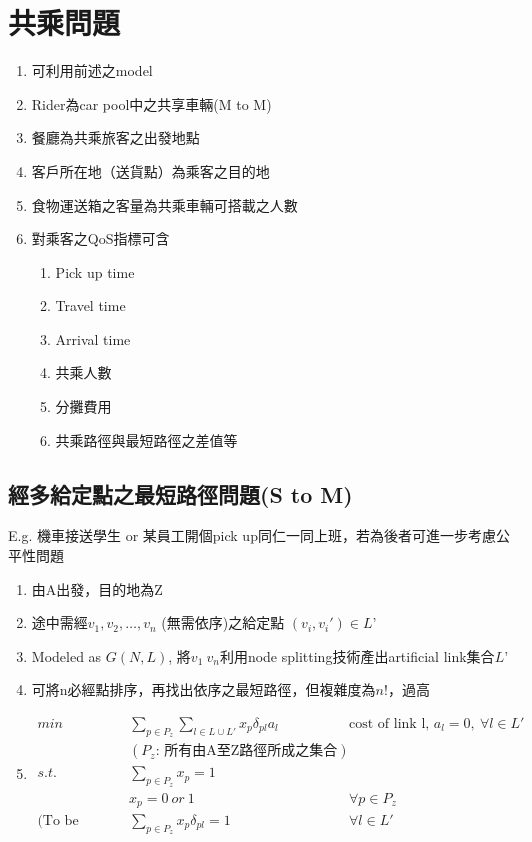 \documentclass{article}
\begin{document}
\section*{共乘問題}

\begin{enumerate}
\def\labelenumi{\arabic{enumi}.}
  \item 可利用前述之model
  \item Rider為car pool中之共享車輛(M to M)
  \item 餐廳為共乘旅客之出發地點
  \item 客戶所在地（送貨點）為乘客之目的地
  \item 食物運送箱之客量為共乘車輛可搭載之人數
  \item 對乘客之QoS指標可含
    \begin{enumerate}
      \def\labelenumii{\arabic{enumii}.}
      \item Pick up time
      \item Travel time
      \item Arrival time
      \item 共乘人數
      \item 分攤費用
      \item 共乘路徑與最短路徑之差值等
    \end{enumerate}
\end{enumerate}

\subsection*{經多給定點之最短路徑問題(S to M)}
E.g. 機車接送學生 or 某員工開個pick up同仁一同上班，若為後者可進一步考慮公平性問題

\begin{enumerate}
\def\labelenumi{\arabic{enumi}.}
  \item 由A出發，目的地為Z
  \item 途中需經\(v_1, v_2, …, v_n\) (無需依序)之給定點 \((v_i, v_i') \in L’\)
  \item Modeled as \(G(N, L)\), 將\(v_1 ~ v_n\)利用node splitting技術產出artificial link集合\(L’\)
  \item 可將n必經點排序，再找出依序之最短路徑，但複雜度為\(n!\)，過高
  \item
    \begin{align*}\tag{LP}
      min & \sum\limits_{p \in P_z} \sum\limits_{l \in L \cup L'} x_p \delta_{pl} a_l && \text{cost of link l, } a_l = 0,\ \forall l \in L' \\
      & (P_z \text{: 所有由A至Z路徑所成之集合}) \\
      s.t. & \sum\limits_{p \in P_z} x_p = 1 \tag{1} \\
      & x_p = 0 \ or \ 1 && \forall p \in P_z \tag{2} \\
      \text{(To be relaxed)} & \sum\limits_{p \in P_z} x_p \delta_{pl} = 1 && \forall l \in L' \tag{3}
    \end{align*}
\end{enumerate}
\end{document}
